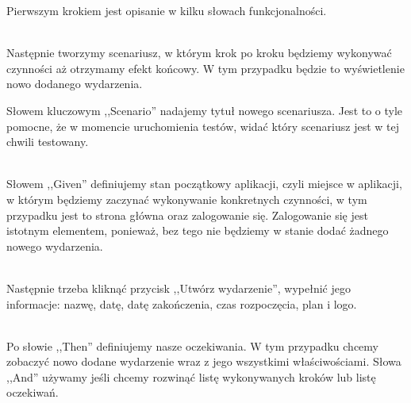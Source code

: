 Pierwszym krokiem jest opisanie w kilku słowach funkcjonalności.

\begin{code}
	
\end{code}\\

Następnie tworzymy scenariusz, w którym krok po kroku będziemy wykonywać czynności aż otrzymamy efekt końcowy. W tym przypadku będzie to wyświetlenie nowo dodanego wydarzenia.

Słowem kluczowym ,,Scenario'' nadajemy tytuł nowego scenariusza. Jest to o tyle pomocne, że w momencie uruchomienia testów, widać który scenariusz jest w tej chwili testowany.

\begin{code}
	
\end{code}\\

Słowem ,,Given'' definiujemy stan początkowy aplikacji, czyli miejsce w aplikacji, w którym będziemy zaczynać wykonywanie konkretnych czynności, w tym przypadku jest to strona główna oraz zalogowanie się. Zalogowanie się jest istotnym elementem, ponieważ, bez tego nie będziemy w stanie dodać żadnego nowego wydarzenia.

\begin{code}
	
\end{code}\\

Następnie trzeba kliknąć przycisk ,,Utwórz wydarzenie'', wypełnić jego informacje: nazwę, datę, datę zakończenia, czas rozpoczęcia, plan i logo.

\begin{code}
	
\end{code}\\

Po słowie ,,Then'' definiujemy nasze oczekiwania. W tym przypadku chcemy zobaczyć nowo dodane wydarzenie wraz z jego wszystkimi właściwościami. Słowa ,,And'' używamy jeśli chcemy rozwinąć listę wykonywanych kroków lub listę oczekiwań.

\begin{code}
	
\end{code}\\

